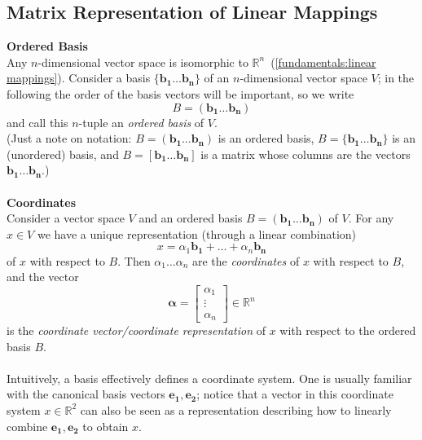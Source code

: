 \documentclass{report}
\begin{document}
\subsection{Matrix Representation of Linear Mappings}%
\textbf{Ordered Basis}\\
Any $n$-dimensional vector space is isomorphic to $\mathbb{R}^n$\ (\ref{fundamentals:linear mappings}).
Consider a basis $\bm{\{b_1\ldots b_n\}}$ of an $n$-dimensional vector space $V$; in the following 
the order of the basis vectors will be important, so we write
\begin{equation*}
B=\bm{(b_1\ldots b_n)}
\end{equation*}
and call this $n$-tuple an \textit{ordered basis} of $V$.\\
(Just a note on notation: $B=\bm{(b_1\ldots b_n)}$ is an ordered basis, 
$B=\bm{\{b_1\ldots b_n\}}$ is an (unordered) basis,
and $B=\bm{[b_1\ldots b_n]}$ is a matrix whose columns are the vectors $\bm{b_1\ldots b_n}$.)\\
\vspace{1mm}\\
\textbf{Coordinates}\\
Consider a vector space $V$ and an ordered basis $B=\bm{(b_1\ldots b_n)}$ of $V$. 
For any $x\in V$ we have a unique representation (through a linear combination)
\begin{equation*}
x=\alpha_1\bm{b_1}+\ldots+\alpha_n\bm{b_n}
\end{equation*}
of $x$ with respect to $B$. Then $\alpha_1\ldots\alpha_n$ are the \textit{coordinates}
of $x$ with respect to $B$, and the vector 
\begin{equation*}
\bm{\alpha}=\begin{bmatrix}\alpha_1\\\vdots\\\alpha_n
\end{bmatrix}\in\mathbb{R}^n
\end{equation*}
is the \textit{coordinate vector/coordinate representation} of $x$
with respect to the ordered basis $B$.\\
\vspace{1mm}\\
Intuitively, a basis effectively defines a coordinate system. One is usually familiar with
the canonical basis vectors $\bm{e_1,e_2}$; notice that a vector in this coordinate system
$x\in\mathbb{R}^2$ can also be seen as a representation describing how to linearly combine
$\bm{e_1,e_2}$ to obtain $x$.\\
\end{document}
